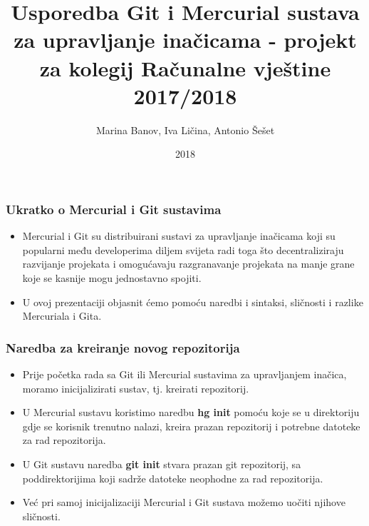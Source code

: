 \documentclass{beamer}
\title{Usporedba Git i Mercurial sustava za upravljanje inačicama - projekt za kolegij Računalne vještine 2017/2018}
\author{Marina Banov, Iva Ličina, Antonio Šešet}
\institute{Tehnički fakultet u Rijeci}
\date{2018}
\begin{document}
 
	\frame{\titlepage}
 
	\begin{frame}
		\frametitle{Ukratko o Mercurial i Git sustavima}
		 \begin{itemize}
			\item Mercurial i Git su distribuirani sustavi za upravljanje inačicama koji su popularni među developerima diljem svijeta radi toga što decentraliziraju razvijanje projekata i omogućavaju razgranavanje projekata na manje grane koje se kasnije mogu jednostavno spojiti.
			\item U ovoj prezentaciji objasnit ćemo pomoću naredbi i sintaksi, sličnosti i razlike Mercuriala i Gita.
		\end{itemize}
	\end{frame}

	\begin{frame}
		\frametitle{Naredba za kreiranje novog  repozitorija}
		 \begin{itemize}
			  \item Prije početka rada sa Git ili Mercurial sustavima za upravljanjem inačica, moramo inicijalizirati sustav, tj. kreirati repozitorij.		
			  \item U Mercurial sustavu koristimo naredbu \textbf{hg init} pomoću koje se u direktoriju gdje se korisnik trenutno nalazi, kreira prazan repozitorij i  potrebne datoteke za rad repozitorija. 
			  \item U Git sustavu naredba \textbf{git init} stvara prazan git repozitorij, sa poddirektorijima koji sadrže datoteke neophodne za rad repozitorija.
			  \item Već pri samoj inicijalizaciji Mercurial i Git sustava možemo uočiti njihove sličnosti.
		\end{itemize}
	\end{frame}
\end{document}

